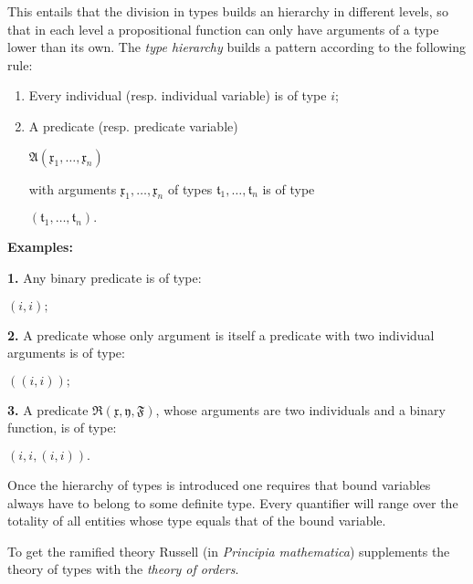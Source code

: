 \documentclass[12pt]{article}
\begin{document}
This entails that the division in types builds an hierarchy in different levels, so that in each level a propositional function can only have arguments of a type lower than its own. The \emph{type hierarchy} builds a pattern according to the following rule:

\begin{enumerate}
\item Every individual (resp. individual variable) is of type $i$;

\item A predicate (resp. predicate variable)  

\begin{center}
$\mathfrak{A} (\mathfrak{x}_1, \ldots, \mathfrak{x}_n)$
\end{center}

with arguments $\mathfrak{x}_1, \ldots, \mathfrak{x}_n$ of types $\mathfrak{t}_1, \ldots, \mathfrak{t}_n$ is of type
                                
\begin{center}
$(\mathfrak{t}_1, \ldots, \mathfrak{t}_n).$
\end{center}
\end{enumerate}

\textbf{Examples:} 

\textbf{1.} Any binary predicate is of type:

\begin{center}
$(i, i);$
\end{center}

\textbf{2.} A predicate whose only argument is itself a predicate with two individual arguments is of type:

\begin{center}
$((i, i));$
\end{center}

\textbf{3.} A predicate $\mathfrak{R} (\mathfrak{x}, \mathfrak{y}, \mathfrak{F})$, whose arguments are two individuals and a binary function, is of type:

\begin{center}
$(i, i, (i, i)).$
\end{center}

Once the hierarchy of types is introduced one requires that bound variables always have to belong to some definite type. Every quantifier will range over the totality of all entities whose type equals that of the bound variable.

To get the ramified theory Russell (in \emph{Principia mathematica}) supplements the theory of types with the \emph{theory of orders}.
\end{document}
